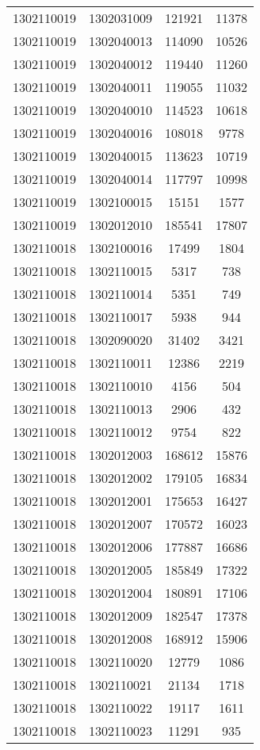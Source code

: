 \begin{longtable}{llcc}
1302110019 & 1302031009 & 121921 & 11378\\
1302110019 & 1302040013 & 114090 & 10526\\
1302110019 & 1302040012 & 119440 & 11260\\
1302110019 & 1302040011 & 119055 & 11032\\
1302110019 & 1302040010 & 114523 & 10618\\
1302110019 & 1302040016 & 108018 & 9778\\
1302110019 & 1302040015 & 113623 & 10719\\
1302110019 & 1302040014 & 117797 & 10998\\
1302110019 & 1302100015 & 15151 & 1577\\
1302110019 & 1302012010 & 185541 & 17807\\
1302110018 & 1302100016 & 17499 & 1804\\
1302110018 & 1302110015 & 5317 & 738\\
1302110018 & 1302110014 & 5351 & 749\\
1302110018 & 1302110017 & 5938 & 944\\
1302110018 & 1302090020 & 31402 & 3421\\
1302110018 & 1302110011 & 12386 & 2219\\
1302110018 & 1302110010 & 4156 & 504\\
1302110018 & 1302110013 & 2906 & 432\\
1302110018 & 1302110012 & 9754 & 822\\
1302110018 & 1302012003 & 168612 & 15876\\
1302110018 & 1302012002 & 179105 & 16834\\
1302110018 & 1302012001 & 175653 & 16427\\
1302110018 & 1302012007 & 170572 & 16023\\
1302110018 & 1302012006 & 177887 & 16686\\
1302110018 & 1302012005 & 185849 & 17322\\
1302110018 & 1302012004 & 180891 & 17106\\
1302110018 & 1302012009 & 182547 & 17378\\
1302110018 & 1302012008 & 168912 & 15906\\
1302110018 & 1302110020 & 12779 & 1086\\
1302110018 & 1302110021 & 21134 & 1718\\
1302110018 & 1302110022 & 19117 & 1611\\
1302110018 & 1302110023 & 11291 & 935\\

\end{longtable}
